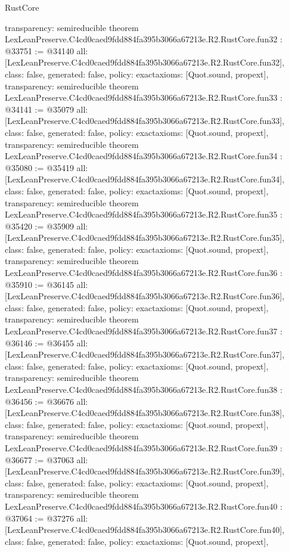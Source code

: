 \begin{lexlean}{RustCore}
\begin{coremodule}
{  transparency: semireducible
}
theorem LexLeanPreserve.C4cd0caed9fdd884fa395b3066a67213e.R2.RustCore.fun32 : @33751 := @34140 {
  all: [LexLeanPreserve.C4cd0caed9fdd884fa395b3066a67213e.R2.RustCore.fun32],
  class: false,
  generated: false,
  policy: exact{axioms: [Quot.sound, propext]},
  transparency: semireducible
}
theorem LexLeanPreserve.C4cd0caed9fdd884fa395b3066a67213e.R2.RustCore.fun33 : @34141 := @35079 {
  all: [LexLeanPreserve.C4cd0caed9fdd884fa395b3066a67213e.R2.RustCore.fun33],
  class: false,
  generated: false,
  policy: exact{axioms: [Quot.sound, propext]},
  transparency: semireducible
}
theorem LexLeanPreserve.C4cd0caed9fdd884fa395b3066a67213e.R2.RustCore.fun34 : @35080 := @35419 {
  all: [LexLeanPreserve.C4cd0caed9fdd884fa395b3066a67213e.R2.RustCore.fun34],
  class: false,
  generated: false,
  policy: exact{axioms: [Quot.sound, propext]},
  transparency: semireducible
}
theorem LexLeanPreserve.C4cd0caed9fdd884fa395b3066a67213e.R2.RustCore.fun35 : @35420 := @35909 {
  all: [LexLeanPreserve.C4cd0caed9fdd884fa395b3066a67213e.R2.RustCore.fun35],
  class: false,
  generated: false,
  policy: exact{axioms: [Quot.sound, propext]},
  transparency: semireducible
}
theorem LexLeanPreserve.C4cd0caed9fdd884fa395b3066a67213e.R2.RustCore.fun36 : @35910 := @36145 {
  all: [LexLeanPreserve.C4cd0caed9fdd884fa395b3066a67213e.R2.RustCore.fun36],
  class: false,
  generated: false,
  policy: exact{axioms: [Quot.sound, propext]},
  transparency: semireducible
}
theorem LexLeanPreserve.C4cd0caed9fdd884fa395b3066a67213e.R2.RustCore.fun37 : @36146 := @36455 {
  all: [LexLeanPreserve.C4cd0caed9fdd884fa395b3066a67213e.R2.RustCore.fun37],
  class: false,
  generated: false,
  policy: exact{axioms: [Quot.sound, propext]},
  transparency: semireducible
}
theorem LexLeanPreserve.C4cd0caed9fdd884fa395b3066a67213e.R2.RustCore.fun38 : @36456 := @36676 {
  all: [LexLeanPreserve.C4cd0caed9fdd884fa395b3066a67213e.R2.RustCore.fun38],
  class: false,
  generated: false,
  policy: exact{axioms: [Quot.sound, propext]},
  transparency: semireducible
}
theorem LexLeanPreserve.C4cd0caed9fdd884fa395b3066a67213e.R2.RustCore.fun39 : @36677 := @37063 {
  all: [LexLeanPreserve.C4cd0caed9fdd884fa395b3066a67213e.R2.RustCore.fun39],
  class: false,
  generated: false,
  policy: exact{axioms: [Quot.sound, propext]},
  transparency: semireducible
}
theorem LexLeanPreserve.C4cd0caed9fdd884fa395b3066a67213e.R2.RustCore.fun40 : @37064 := @37276 {
  all: [LexLeanPreserve.C4cd0caed9fdd884fa395b3066a67213e.R2.RustCore.fun40],
  class: false,
  generated: false,
  policy: exact{axioms: [Quot.sound, propext]},
}
\end{coremodule}
\end{lexlean}
